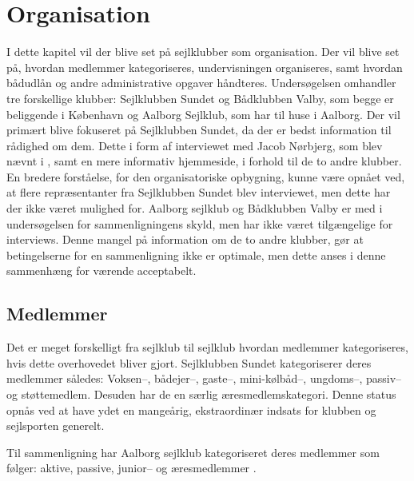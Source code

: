 \chapter{Organisation}\label{chap:organisation}

I dette kapitel vil der blive set på sejlklubber som organisation. 
Der vil blive set på, hvordan medlemmer kategoriseres, undervisningen organiseres, samt hvordan bådudlån og andre administrative opgaver håndteres. 
Undersøgelsen omhandler tre forskellige klubber: Sejlklubben Sundet og Bådklubben Valby, som begge er beliggende i København og Aalborg Sejlklub, som har til huse i Aalborg. 
Der vil primært blive fokuseret på Sejlklubben Sundet, da der er bedst information til rådighed om dem. 
Dette i form af interviewet med Jacob Nørbjerg, som blev nævnt i , samt en mere informativ hjemmeside, i forhold til de to andre klubber. 
En bredere forståelse, for den organisatoriske opbygning, kunne være opnået ved, at flere repræsentanter fra Sejlklubben Sundet blev interviewet, men dette har der ikke været mulighed for.
Aalborg sejlklub og Bådklubben Valby er med i undersøgelsen for sammenligningens skyld, men har ikke været tilgængelige for interviews. 
Denne mangel på information om de to andre klubber, gør at betingelserne for en sammenligning ikke er optimale, men dette anses i denne sammenhæng for værende acceptabelt.

\section{Medlemmer}\label{sec:organisation-medlemmer}

Det er meget forskelligt fra sejlklub til sejlklub hvordan medlemmer kategoriseres, hvis dette overhovedet bliver gjort.
Sejlklubben Sundet kategoriserer deres medlemmer således: Voksen--, bådejer--, gaste--, mini-kølbåd--,
ungdoms--, passiv-- og støttemedlem. 
Desuden har de en særlig æresmedlemskategori.
Denne status opnås ved at have ydet en mangeårig, ekstraordinær indsats for klubben og sejlsporten generelt.\citep{sundet_vedtaegter}

Til sammenligning har Aalborg sejlklub kategoriseret deres medlemmer som følger: aktive, passive, junior-- og
æresmedlemmer \citep{aalborg_sejlklub_vedtaegter}.

